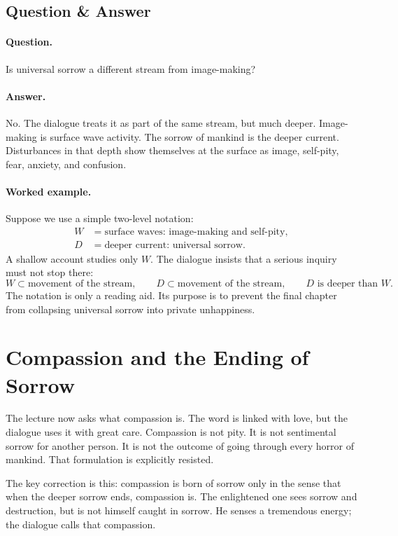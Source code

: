\subsection{Question \& Answer}

\paragraph{Question.}
Is universal sorrow a different stream from image-making?

\paragraph{Answer.}
No. The dialogue treats it as part of the same stream, but much deeper. Image-making is surface wave activity. The sorrow of mankind is the deeper current. Disturbances in that depth show themselves at the surface as image, self-pity, fear, anxiety, and confusion.

\paragraph{Worked example.}
Suppose we use a simple two-level notation:
\begin{align}
W &= \text{surface waves: image-making and self-pity}, \\
D &= \text{deeper current: universal sorrow}.
\end{align}
A shallow account studies only $W$. The dialogue insists that a serious inquiry must not stop there:
\begin{equation}
W \subset \text{movement of the stream}, 
\qquad
D \subset \text{movement of the stream},
\qquad
D \text{ is deeper than } W.
\end{equation}
The notation is only a reading aid. Its purpose is to prevent the final chapter from collapsing universal sorrow into private unhappiness.

\section{Compassion and the Ending of Sorrow}

The lecture now asks what compassion is. The word is linked with love, but the dialogue uses it with great care. Compassion is not pity. It is not sentimental sorrow for another person. It is not the outcome of going through every horror of mankind. That formulation is explicitly resisted.

The key correction is this: compassion is born of sorrow only in the sense that when the deeper sorrow ends, compassion is. The enlightened one sees sorrow and destruction, but is not himself caught in sorrow. He senses a tremendous energy; the dialogue calls that compassion.

